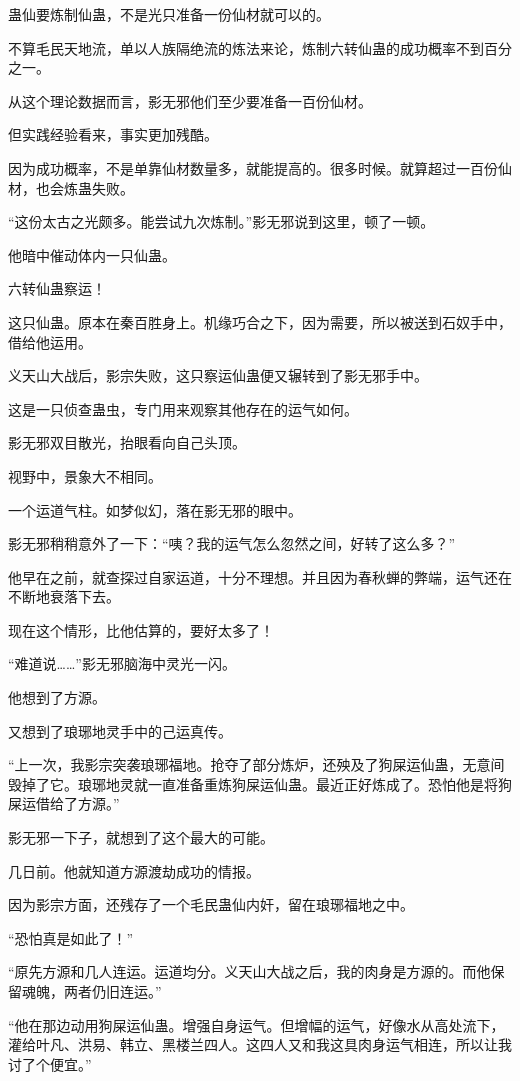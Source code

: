 \begin{this_body}
蛊仙要炼制仙蛊，不是光只准备一份仙材就可以的。

不算毛民天地流，单以人族隔绝流的炼法来论，炼制六转仙蛊的成功概率不到百分之一。

从这个理论数据而言，影无邪他们至少要准备一百份仙材。

但实践经验看来，事实更加残酷。

因为成功概率，不是单靠仙材数量多，就能提高的。很多时候。就算超过一百份仙材，也会炼蛊失败。

“这份太古之光颇多。能尝试九次炼制。”影无邪说到这里，顿了一顿。

他暗中催动体内一只仙蛊。

六转仙蛊察运！

这只仙蛊。原本在秦百胜身上。机缘巧合之下，因为需要，所以被送到石奴手中，借给他运用。

义天山大战后，影宗失败，这只察运仙蛊便又辗转到了影无邪手中。

这是一只侦查蛊虫，专门用来观察其他存在的运气如何。

影无邪双目散光，抬眼看向自己头顶。

视野中，景象大不相同。

一个运道气柱。如梦似幻，落在影无邪的眼中。

影无邪稍稍意外了一下：“咦？我的运气怎么忽然之间，好转了这么多？”

他早在之前，就查探过自家运道，十分不理想。并且因为春秋蝉的弊端，运气还在不断地衰落下去。

现在这个情形，比他估算的，要好太多了！

“难道说……”影无邪脑海中灵光一闪。

他想到了方源。

又想到了琅琊地灵手中的己运真传。

“上一次，我影宗突袭琅琊福地。抢夺了部分炼炉，还殃及了狗屎运仙蛊，无意间毁掉了它。琅琊地灵就一直准备重炼狗屎运仙蛊。最近正好炼成了。恐怕他是将狗屎运借给了方源。”

影无邪一下子，就想到了这个最大的可能。

几日前。他就知道方源渡劫成功的情报。

因为影宗方面，还残存了一个毛民蛊仙内奸，留在琅琊福地之中。

“恐怕真是如此了！”

“原先方源和几人连运。运道均分。义天山大战之后，我的肉身是方源的。而他保留魂魄，两者仍旧连运。”

“他在那边动用狗屎运仙蛊。增强自身运气。但增幅的运气，好像水从高处流下，灌给叶凡、洪易、韩立、黑楼兰四人。这四人又和我这具肉身运气相连，所以让我讨了个便宜。”


\end{this_body}
